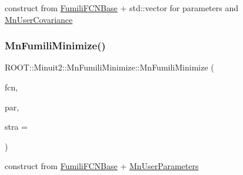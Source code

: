 construct from \mbox{\hyperlink{classROOT_1_1Minuit2_1_1FumiliFCNBase}{Fumili\+F\+C\+N\+Base}} + std\+::vector for parameters and \mbox{\hyperlink{classROOT_1_1Minuit2_1_1MnUserCovariance}{Mn\+User\+Covariance}} 

\mbox{\label{classROOT_1_1Minuit2_1_1MnFumiliMinimize_aec4f0adff373393b4023f3a783b7d4bd}} 
\subsubsection{\texorpdfstring{MnFumiliMinimize()}{MnFumiliMinimize()}\hspace{0.1cm}{\footnotesize\ttfamily [4/21]}}
{\footnotesize\ttfamily R\+O\+O\+T\+::\+Minuit2\+::\+Mn\+Fumili\+Minimize\+::\+Mn\+Fumili\+Minimize (\begin{DoxyParamCaption}\item[{const \mbox{\hyperlink{classROOT_1_1Minuit2_1_1FumiliFCNBase}{Fumili\+F\+C\+N\+Base}} \&}]{fcn,  }\item[{const \mbox{\hyperlink{classROOT_1_1Minuit2_1_1MnUserParameters}{Mn\+User\+Parameters}} \&}]{par,  }\item[{unsigned int}]{stra = {} }\end{DoxyParamCaption})\hspace{0.3cm}{\ttfamily [inline]}}



construct from \mbox{\hyperlink{classROOT_1_1Minuit2_1_1FumiliFCNBase}{Fumili\+F\+C\+N\+Base}} + \mbox{\hyperlink{classROOT_1_1Minuit2_1_1MnUserParameters}{Mn\+User\+Parameters}} 

\mbox{\label{classROOT_1_1Minuit2_1_1MnFumiliMinimize_a3dd4f225ca0cdfdc6eb542ee32667984}} 
